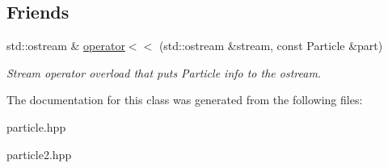 \subsection*{Friends}
\begin{DoxyCompactItemize}
\item 
\mbox{\label{classFluorophore_a45b79869238bb1c8b17beccafd1fd78b}} 
std\+::ostream \& \hyperlink{classFluorophore_a45b79869238bb1c8b17beccafd1fd78b}{operator$<$$<$} (std\+::ostream \&stream, const Particle \&part)
\begin{DoxyCompactList}\small\item\em Stream operator overload that puts Particle info to the ostream. \end{DoxyCompactList}\end{DoxyCompactItemize}


The documentation for this class was generated from the following files\+:\begin{DoxyCompactItemize}
\item 
particle.\+hpp\item 
particle2.\+hpp\end{DoxyCompactItemize}
